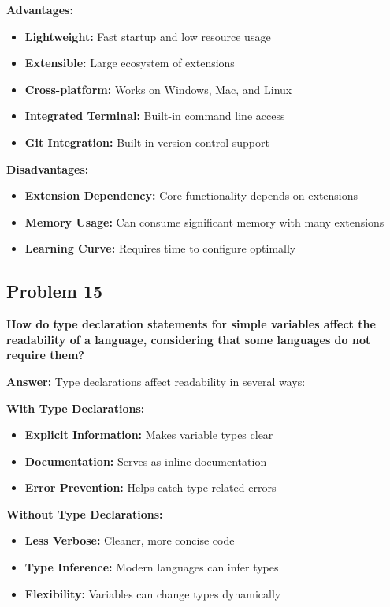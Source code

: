 \documentclass[11pt,a4paper]{article}
\begin{document}
\textbf{Advantages:}
\begin{itemize}
\item \textbf{Lightweight:} Fast startup and low resource usage
\item \textbf{Extensible:} Large ecosystem of extensions
\item \textbf{Cross-platform:} Works on Windows, Mac, and Linux
\item \textbf{Integrated Terminal:} Built-in command line access
\item \textbf{Git Integration:} Built-in version control support
\end{itemize}

\textbf{Disadvantages:}
\begin{itemize}
\item \textbf{Extension Dependency:} Core functionality depends on extensions
\item \textbf{Memory Usage:} Can consume significant memory with many extensions
\item \textbf{Learning Curve:} Requires time to configure optimally
\end{itemize}

\subsection{Problem 15}
\textbf{How do type declaration statements for simple variables affect the readability of a language, considering that some languages do not require them?}

\textbf{Answer:}
Type declarations affect readability in several ways:

\textbf{With Type Declarations:}
\begin{itemize}
\item \textbf{Explicit Information:} Makes variable types clear
\item \textbf{Documentation:} Serves as inline documentation
\item \textbf{Error Prevention:} Helps catch type-related errors
\end{itemize}

\textbf{Without Type Declarations:}
\begin{itemize}
\item \textbf{Less Verbose:} Cleaner, more concise code
\item \textbf{Type Inference:} Modern languages can infer types
\item \textbf{Flexibility:} Variables can change types dynamically
\end{itemize}
\end{document}
